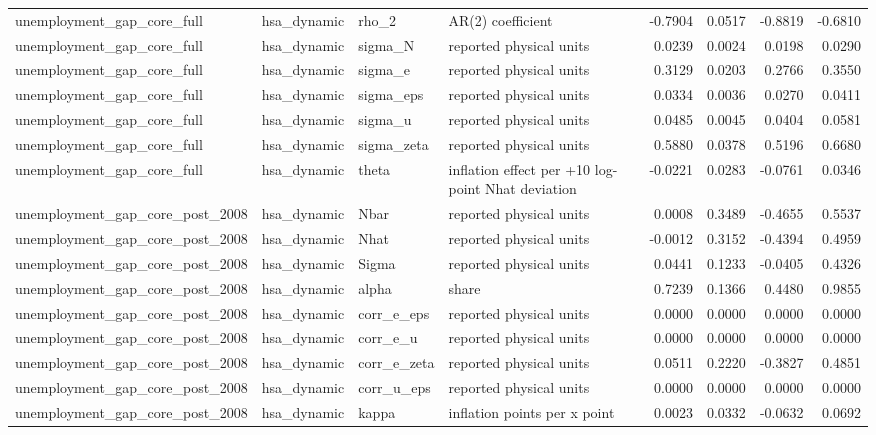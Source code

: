 \begin{tabular}{llllrrrr}
unemployment\_gap\_core\_full & hsa\_dynamic & rho\_2 & AR(2) coefficient & -0.7904 & 0.0517 & -0.8819 & -0.6810 \\
unemployment\_gap\_core\_full & hsa\_dynamic & sigma\_N & reported physical units & 0.0239 & 0.0024 & 0.0198 & 0.0290 \\
unemployment\_gap\_core\_full & hsa\_dynamic & sigma\_e & reported physical units & 0.3129 & 0.0203 & 0.2766 & 0.3550 \\
unemployment\_gap\_core\_full & hsa\_dynamic & sigma\_eps & reported physical units & 0.0334 & 0.0036 & 0.0270 & 0.0411 \\
unemployment\_gap\_core\_full & hsa\_dynamic & sigma\_u & reported physical units & 0.0485 & 0.0045 & 0.0404 & 0.0581 \\
unemployment\_gap\_core\_full & hsa\_dynamic & sigma\_zeta & reported physical units & 0.5880 & 0.0378 & 0.5196 & 0.6680 \\
unemployment\_gap\_core\_full & hsa\_dynamic & theta & inflation effect per +10 log-point Nhat deviation & -0.0221 & 0.0283 & -0.0761 & 0.0346 \\
unemployment\_gap\_core\_post\_2008 & hsa\_dynamic & Nbar & reported physical units & 0.0008 & 0.3489 & -0.4655 & 0.5537 \\
unemployment\_gap\_core\_post\_2008 & hsa\_dynamic & Nhat & reported physical units & -0.0012 & 0.3152 & -0.4394 & 0.4959 \\
unemployment\_gap\_core\_post\_2008 & hsa\_dynamic & Sigma & reported physical units & 0.0441 & 0.1233 & -0.0405 & 0.4326 \\
unemployment\_gap\_core\_post\_2008 & hsa\_dynamic & alpha & share & 0.7239 & 0.1366 & 0.4480 & 0.9855 \\
unemployment\_gap\_core\_post\_2008 & hsa\_dynamic & corr\_e\_eps & reported physical units & 0.0000 & 0.0000 & 0.0000 & 0.0000 \\
unemployment\_gap\_core\_post\_2008 & hsa\_dynamic & corr\_e\_u & reported physical units & 0.0000 & 0.0000 & 0.0000 & 0.0000 \\
unemployment\_gap\_core\_post\_2008 & hsa\_dynamic & corr\_e\_zeta & reported physical units & 0.0511 & 0.2220 & -0.3827 & 0.4851 \\
unemployment\_gap\_core\_post\_2008 & hsa\_dynamic & corr\_u\_eps & reported physical units & 0.0000 & 0.0000 & 0.0000 & 0.0000 \\
unemployment\_gap\_core\_post\_2008 & hsa\_dynamic & kappa & inflation points per x point & 0.0023 & 0.0332 & -0.0632 & 0.0692 \\

\end{tabular}
